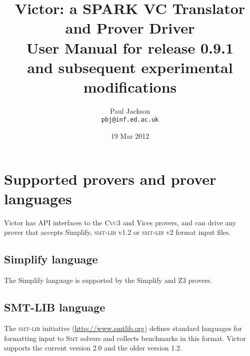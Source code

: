 \documentclass[12pt,fleqn]{article}
\title{Victor: a SPARK VC Translator and Prover Driver \\[4ex]
  \Large
  User Manual for release 0.9.1 \\
  and subsequent experimental modifications \\[1ex]
}
\author{Paul Jackson \\
        \texttt{pbj@inf.ed.ac.uk}}
\date{19 Mar 2012}
\newcommand{\cvcthree}{\textsc{Cvc}3}
\newcommand{\zthree}{\textsc{Z}3}
\newcommand{\yices}{Yices}
\newcommand{\smt}{\textsc{Smt}}
\newcommand{\smtlib}{\textsc{smt-lib}}
\begin{document}
\maketitle


\tableofcontents


\setlength{\parskip}{0.8\baselineskip}


\section{Supported provers and prover languages}

Victor has API interfaces to the \cvcthree{} and \yices{} provers, and
can drive any prover that accepts Simplify, \smtlib{} v1.2 or
\smtlib{} v2 format input files.

\subsection{Simplify language}

The Simplify language is supported by the Simplify and \zthree{} provers.

\subsection{SMT-LIB language}

The \smtlib{} initiative (\url{http://www.smtlib.org}) defines
standard languages for formatting input to \smt{} solvers and collects
benchmarks in this format. Victor supports the current version 2.0
and the older version 1.2.
\end{document}

